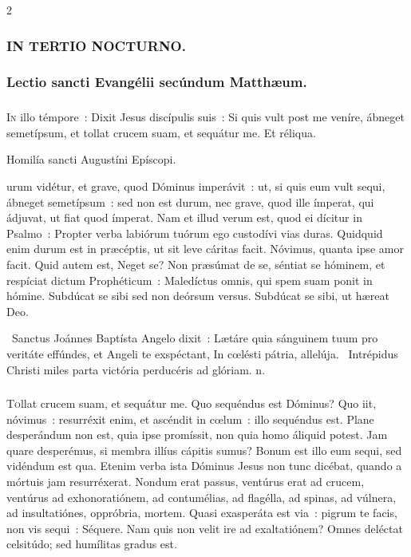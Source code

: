 \documentclass[9pt,twoside]{extarticle}
\begin{document}
\begin{multicols}{2}
{{\subsubsection*{\center \textsc{IN TERTIO NOCTURNO.}}
\subsubsection*{\center Lectio sancti Evangélii secúndum Matthæum.}
\subsubsection*{\center {}}
\lettrine{I}n illo témpore~: Dixit Jesus discípulis suis~: Si quis vult post me veníre, ábneget semetípsum, et tollat crucem suam, et sequátur me. Et réliqua.

\begin{center}Homilía sancti Augustíni Epíscopi.\\
\end{center}
urum vidétur, et grave, quod Dóminus imperávit~: ut, si quis eum vult sequi, ábneget semetípsum~: sed non est durum, nec grave, quod ille ímperat, qui ádjuvat, ut fiat quod ímperat. Nam et illud verum est, quod ei dícitur in Psalmo~: Propter verba labiórum tuórum ego custodívi vias duras. Quidquid enim durum est in præcéptis, ut sit leve cáritas facit. Nóvimus, quanta ipse amor facit. Quid autem est, Neget se? Non præsúmat de se, séntiat se hóminem, et respíciat dictum Prophéticum~: Maledíctus omnis, qui spem suam ponit in hómine. Subdúcat se sibi sed non deórsum versus. Subdúcat se sibi, ut hæreat Deo.

\begin{tightlist}{}
\item {}~Sanctus Joánnes Baptísta Angelo dixit~: Lætáre quia sánguinem tuum pro veritáte effúndes, et Angeli te exspéctant, \textred{*} In cœlésti pátria, allelúja. ~Intrépidus Christi miles parta victória perducéris ad glóriam. n.
\end{tightlist}

\subsubsection*{\center {}}
\lettrine{T}ollat crucem suam, et sequátur me. Quo sequéndus est Dóminus? Quo iit, nóvimus~: resurréxit enim, et ascéndit in cœlum~: illo sequéndus est. Plane desperándum non est, quia ipse promíssit, non quia homo áliquid potest. Jam quare desperémus, si membra illíus cápitis sumus? Bonum est illo eum sequi, sed vidéndum est qua. Etenim verba ista Dóminus Jesus non tunc dicébat, quando a mórtuis jam resurréxerat. Nondum erat passus, ventúrus erat ad crucem, ventúrus ad exhonoratiónem, ad contumélias, ad flagélla, ad spinas, ad vúlnera, ad insultatiónes, oppróbria, mortem. Quasi exasperáta est via~: pigrum te facis, non vis sequi~: Séquere. Nam quis non velit ire ad exaltatiónem? Omnes deléctat celsitúdo; sed humílitas gradus est.

}}
\end{multicols}
\end{document}
